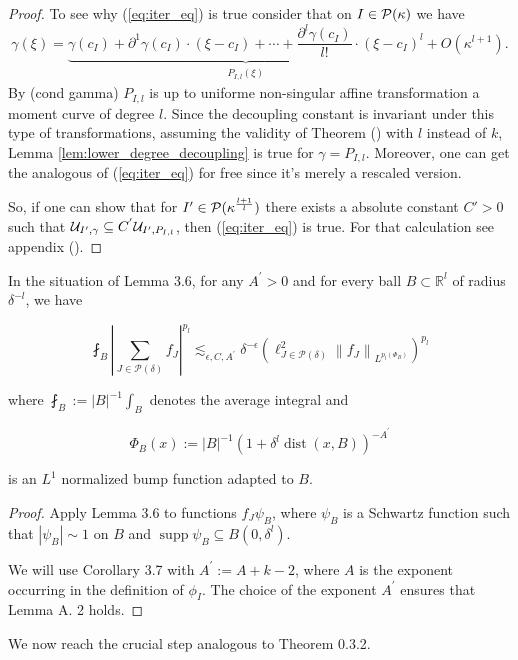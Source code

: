 \begin{proof}
     To see why (\ref{eq:iter_eq}) is true consider that on $I\in \mathcal{P}(\kappa)$ we have
     \begin{equation}
        \gamma(\xi) = \underbrace{\gamma\left(c_{I}\right) + \partial^{1} \gamma\left(c_{I}\right) \cdot (\xi - c_{I}) + \cdots + \frac{\partial^{l} \gamma\left(c_{I}\right)}{l!} \cdot (\xi - c_{I})^{l}}_{\substack{P_{I,l}(\xi)}} + O\left(\kappa^{l+1}\right).     
    \end{equation}
    By (cond gamma) $P_{I,l}$ is up to uniforme non-singular affine transformation a moment curve of degree $l$.
    Since the decoupling constant is invariant under this type of transformations, assuming the validity of Theorem () with $l$ instead of $k$, 
      Lemma \ref{lem:lower_degree_decoupling} is true for $\gamma = P_{I,l}$. Moreover, one can get the analogous of (\ref{eq:iter_eq})
     for free since it's merely a rescaled version. 
     
    So, if one can show that for $I^{\prime}\in \mathcal{P}(\kappa^{\frac{l+1}{l}})$ 
    there exists a absolute constant $C'>0$ such that $\mathcal{U}_{I^{\prime},\gamma}\subseteq C^{'}\mathcal{U}_{I^{\prime}, P_{I,l}}$, then (\ref{eq:iter_eq})
     is true. For that calculation see appendix (). 
\end{proof}
\begin{cor}
 In the situation of Lemma 3.6, for any $A^{\prime}>0$ and for every ball $B \subset \mathbb{R}^{l}$ of radius $\delta^{-l}$, we have

$$
\fint_{B}\left|\sum_{J \in \mathcal{P}(\delta)} f_{J}\right|^{p_{l}} \lesssim_{\epsilon, C, A^{\prime}} \delta^{-\epsilon}\left(\ell_{J \in \mathcal{P}(\delta)}^{2}\left\|f_{J}\right\|_{L^{p_{l}\left(\Phi_{B}\right)}}\right)^{p_{l}}
$$

where $\fint_{B}:=|B|^{-1} \int_{B}$ denotes the average integral and

$$
\Phi_{B}(x):=|B|^{-1}\left(1+\delta^{l} \operatorname{dist}(x, B)\right)^{-A^{\prime}}
$$

is an $L^{1}$ normalized bump function adapted to $B$.
\end{cor}
\begin{proof}
 Apply Lemma 3.6 to functions $f_{J} \psi_{B}$, where $\psi_{B}$ is a Schwartz function such that $\left|\psi_{B}\right| \sim 1$ on $B$ and $\operatorname{supp} \widehat{\psi_{B}} \subseteq B\left(0, \delta^{l}\right)$.

We will use Corollary 3.7 with $A^{\prime}:=A+k-2$, where $A$ is the exponent occurring in the definition of $\phi_{I}$. The choice of the exponent $A^{\prime}$ ensures that Lemma A. 2 holds.
\end{proof}

We now reach the crucial step analogous to Theorem 0.3.2. 

